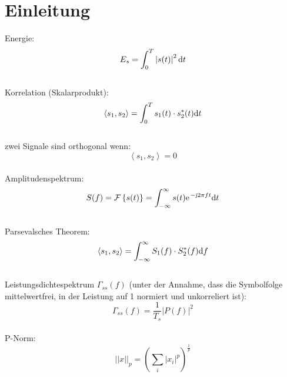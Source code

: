 \chapter{Einleitung}
Energie:
\[
	E_s= \int_{0}^{T} \left|s(t)\right|^2 \mathrm{d} t
\]
~\\
Korrelation (Skalarprodukt):
\[
	\left\langle s_1,s_2 \right\rangle = \int_{0}^{T} s_1(t) \cdot s_2^*(t) \mathrm{d} t
\]
~\\
zwei Signale sind orthogonal wenn:
\[
	\left\langle s_1,s_2 \right\rangle = 0
\]
~\\
Amplitudenspektrum:
\[
	S(f) = \mathcal{F}\left\lbrace s(t) \right\rbrace = \int_{-\infty}^{\infty} s(t) \e^{-\im 2 \pi ft} \di t
\]
~\\
Parsevalsches Theorem:
\[
	\left\langle s_1,s_2 \right\rangle = \int_{-\infty}^{\infty} S_1(f) \cdot S_2^*(f) \mathrm{d} f
\]
~\\
Leistungsdichtespektrum $\Gamma_{ss}(f)$ (unter der Annahme, dass die Symbolfolge
mittelwertfrei, in der Leistung auf 1 normiert und unkorreliert ist):
\[
	\Gamma_{ss}(f) = \frac{1}{T_s} \left|P(f)\right|^2
\]
~\\
P-Norm:
\[
	\left||x\right||_p = \left(\sum_{i}\left|x_i\right|^p\right)^\frac{1}{p}
\]